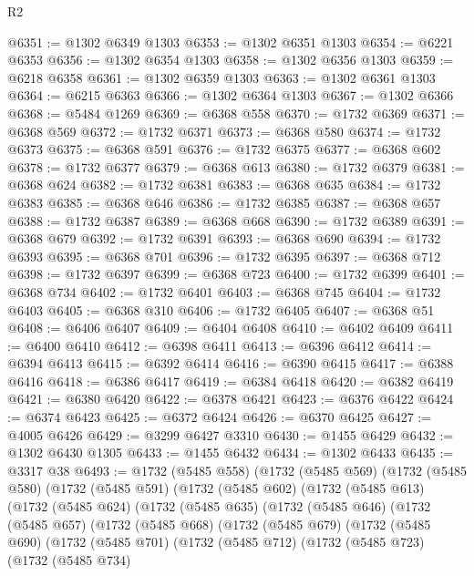\begin{lexlean}{R2}
\begin{coremodule}
@6351 := @1302 @6349 @1303
@6353 := @1302 @6351 @1303
@6354 := @6221 @6353
@6356 := @1302 @6354 @1303
@6358 := @1302 @6356 @1303
@6359 := @6218 @6358
@6361 := @1302 @6359 @1303
@6363 := @1302 @6361 @1303
@6364 := @6215 @6363
@6366 := @1302 @6364 @1303
@6367 := @1302 @6366
@6368 := @5484 @1269
@6369 := @6368 @558
@6370 := @1732 @6369
@6371 := @6368 @569
@6372 := @1732 @6371
@6373 := @6368 @580
@6374 := @1732 @6373
@6375 := @6368 @591
@6376 := @1732 @6375
@6377 := @6368 @602
@6378 := @1732 @6377
@6379 := @6368 @613
@6380 := @1732 @6379
@6381 := @6368 @624
@6382 := @1732 @6381
@6383 := @6368 @635
@6384 := @1732 @6383
@6385 := @6368 @646
@6386 := @1732 @6385
@6387 := @6368 @657
@6388 := @1732 @6387
@6389 := @6368 @668
@6390 := @1732 @6389
@6391 := @6368 @679
@6392 := @1732 @6391
@6393 := @6368 @690
@6394 := @1732 @6393
@6395 := @6368 @701
@6396 := @1732 @6395
@6397 := @6368 @712
@6398 := @1732 @6397
@6399 := @6368 @723
@6400 := @1732 @6399
@6401 := @6368 @734
@6402 := @1732 @6401
@6403 := @6368 @745
@6404 := @1732 @6403
@6405 := @6368 @310
@6406 := @1732 @6405
@6407 := @6368 @51
@6408 := @6406 @6407
@6409 := @6404 @6408
@6410 := @6402 @6409
@6411 := @6400 @6410
@6412 := @6398 @6411
@6413 := @6396 @6412
@6414 := @6394 @6413
@6415 := @6392 @6414
@6416 := @6390 @6415
@6417 := @6388 @6416
@6418 := @6386 @6417
@6419 := @6384 @6418
@6420 := @6382 @6419
@6421 := @6380 @6420
@6422 := @6378 @6421
@6423 := @6376 @6422
@6424 := @6374 @6423
@6425 := @6372 @6424
@6426 := @6370 @6425
@6427 := @4005 @6426
@6429 := @3299 @6427 @3310
@6430 := @1455 @6429
@6432 := @1302 @6430 @1305
@6433 := @1455 @6432
@6434 := @1302 @6433
@6435 := @3317 @38
@6493 := @1732
    (@5485 @558)
    (@1732
      (@5485 @569)
      (@1732
        (@5485 @580)
        (@1732
          (@5485 @591)
          (@1732
            (@5485 @602)
            (@1732
              (@5485 @613)
              (@1732
                (@5485 @624)
                (@1732
                  (@5485 @635)
                  (@1732
                    (@5485 @646)
                    (@1732
                      (@5485 @657)
                      (@1732
                        (@5485 @668)
                        (@1732
                          (@5485 @679)
                          (@1732
                            (@5485 @690)
                            (@1732
                              (@5485 @701)
                              (@1732
                                (@5485 @712)
                                (@1732
                                  (@5485 @723)
                                  (@1732
                                    (@5485 @734)

\end{coremodule}
\end{lexlean}
